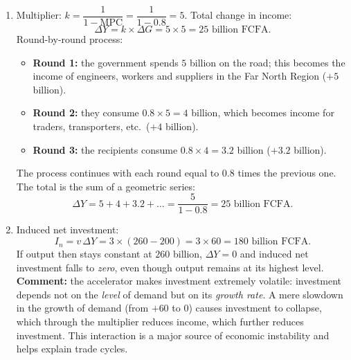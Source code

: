 \documentclass[11pt]{article}
\begin{document}
\begin{corrige}
\begin{enumerate}
\item Multiplier: $k = \dfrac{1}{1 - \text{MPC}} = \dfrac{1}{1 - 0.8} = 5$. Total change in income:
\[ \Delta Y = k \times \Delta G = 5 \times 5 = 25 \text{ billion FCFA}. \]
Round-by-round process:
\begin{itemize}
\item \textbf{Round 1:} the government spends $5$ billion on the road; this becomes the income of engineers, workers and suppliers in the Far North Region ($+5$ billion).
\item \textbf{Round 2:} they consume $0.8 \times 5 = 4$ billion, which becomes income for traders, transporters, etc.\ ($+4$ billion).
\item \textbf{Round 3:} the recipients consume $0.8 \times 4 = 3.2$ billion ($+3.2$ billion).
\end{itemize}
The process continues with each round equal to $0.8$ times the previous one. The total is the sum of a geometric series:
\[ \Delta Y = 5 + 4 + 3.2 + \dots = \frac{5}{1 - 0.8} = 25 \text{ billion FCFA}. \]
\item Induced net investment:
\[ I_n = v\,\Delta Y = 3 \times (260 - 200) = 3 \times 60 = 180 \text{ billion FCFA}. \]
If output then stays constant at $260$ billion, $\Delta Y = 0$ and induced net investment falls to \emph{zero}, even though output remains at its highest level. \textbf{Comment:} the accelerator makes investment extremely volatile: investment depends not on the \emph{level} of demand but on its \emph{growth rate}. A mere slowdown in the growth of demand (from $+60$ to $0$) causes investment to collapse, which through the multiplier reduces income, which further reduces investment. This interaction is a major source of economic instability and helps explain trade cycles.
\end{enumerate}
\end{corrige}
\end{document}
